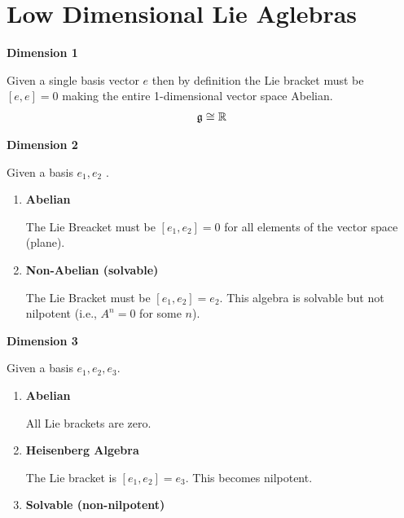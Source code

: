 \documentclass[12pt,a4paper]{report}
\begin{document}
\chapter{Low Dimensional Lie Aglebras}

\begin{description}
	\item \textbf{Dimension 1}

	Given a single basis vector $e$ then by definition the Lie bracket must be $[e,e]=0$	making the entire 1-dimensional vector space Abelian.
	\begin{align*}
		\mathfrak{g} \cong \mathbb{R}
	\end{align*}
	
	\item \textbf{Dimension 2}
	
	Given a basis $e_1, e_2$ .
	\begin{enumerate}
		\item \textbf{Abelian}
		
			The Lie Breacket must be $[e_1, e_2]=0$ for all elements of the vector space (plane).
		
		\item \textbf{Non-Abelian (solvable)}
		
			The Lie Bracket must be $[e_1,e_2] = e_2$.  This algebra is solvable but not nilpotent (i.e., $A^n=0$ for some $n$).
			
	\end{enumerate}
	\item \textbf{Dimension 3}
	
	Given a basis $e_1, e_2, e_3$.
	
	\begin{enumerate}
		\item \textbf{Abelian}
		
		All Lie brackets are zero.
		
		\item \textbf{Heisenberg Algebra}	
		
		The Lie bracket is $[e_1, e_2] = e_3$.  This becomes nilpotent.
		
		\item \textbf{Solvable (non-nilpotent)}	
	
	

\end{enumerate}
\end{description}
\end{document}
